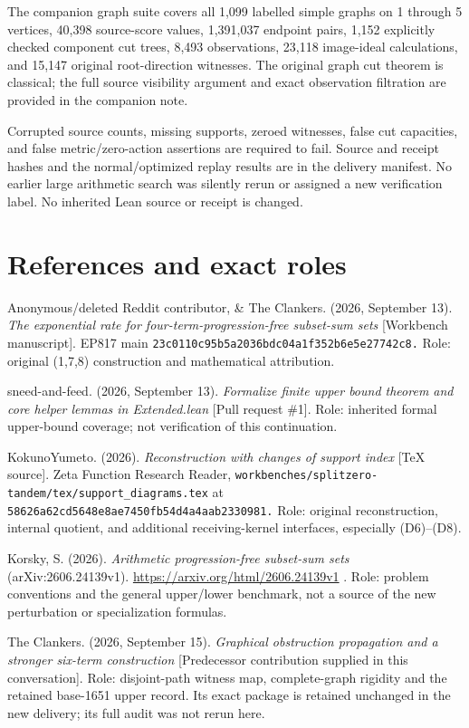 The companion graph suite covers all 1,099 labelled simple graphs on 1 through 5 vertices, 40,398 source-score values, 1,391,037 endpoint pairs, 1,152 explicitly checked component cut trees, 8,493 observations, 23,118 image-ideal calculations, and 15,147 original root-direction witnesses. The original graph cut theorem is classical; the full source visibility argument and exact observation filtration are provided in the companion note.

Corrupted source counts, missing supports, zeroed witnesses, false cut capacities, and false metric/zero-action assertions are required to fail. Source and receipt hashes and the normal/optimized replay results are in the delivery manifest. No earlier large arithmetic search was silently rerun or assigned a new verification label. No inherited Lean source or receipt is changed.

\section{References and exact roles}\label{n12-references-and-exact-roles}

Anonymous/deleted Reddit contributor, \& The Clankers. (2026, September 13). \emph{The exponential rate for four-term-progression-free subset-sum sets} {[}Workbench manuscript{]}. EP817 main \nolinkurl{23c0110c95b5a2036bdc04a1f352b6e5e27742c8.} Role: original (1,7,8) construction and mathematical attribution.

sneed-and-feed. (2026, September 13). \emph{Formalize finite upper bound theorem and core helper lemmas in Extended.lean} {[}Pull request \#1{]}. Role: inherited formal upper-bound coverage; not verification of this continuation.

KokunoYumeto. (2026). \emph{Reconstruction with changes of support index} {[}TeX source{]}. Zeta Function Research Reader, \nolinkurl{workbenches/splitzero-tandem/tex/support_diagrams.tex} at \nolinkurl{58626a62cd5648e8ae7450fb54d4a4aab2330981.} Role: original reconstruction, internal quotient, and additional receiving-kernel interfaces, especially (D6)--(D8).

Korsky, S. (2026). \emph{Arithmetic progression-free subset-sum sets} (arXiv:2606.24139v1). \url{https://arxiv.org/html/2606.24139v1} . Role: problem conventions and the general upper/lower benchmark, not a source of the new perturbation or specialization formulas.

The Clankers. (2026, September 15). \emph{Graphical obstruction propagation and a stronger six-term construction} {[}Predecessor contribution supplied in this conversation{]}. Role: disjoint-path witness map, complete-graph rigidity and the retained base-1651 upper record. Its exact package is retained unchanged in the new delivery; its full audit was not rerun here.
